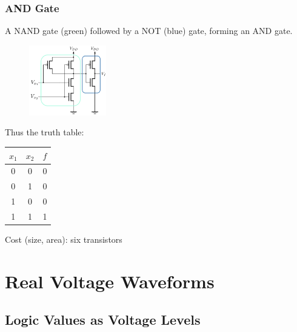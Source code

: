 \documentclass[12pt,openany]{book}
\begin{document}
			      	\subsubsection{AND Gate}
			      	A NAND gate (green) followed by a NOT (blue) gate, forming an AND gate.
			      	\begin{figure}[h]
			      		\centering
			      		\includegraphics[width=0.3\textwidth]{circuits/9.1.5_3.png}
			      	\end{figure}
			      	        
			      	Thus the truth table:
			      	        
			      	\begin{center}
			      		\begin{tabular}{cc|c}
			      			\hline
			      			\( x_1 \) & \( x_2 \) & \( f \) \\
			      			\hline
			      			0         & 0         & 0       \\
			      			0         & 1         & 0       \\
			      			1         & 0         & 0       \\
			      			1         & 1         & 1       \\
			      			\hline
			      		\end{tabular}
			      	\end{center}
			      	        
			      	Cost (size, area): six transistors
			      	
			      	
			      	\section{Real Voltage Waveforms}
			      	\subsection{Logic Values as Voltage Levels}
			      	\vspace*{5px}
			      	
\end{document}
